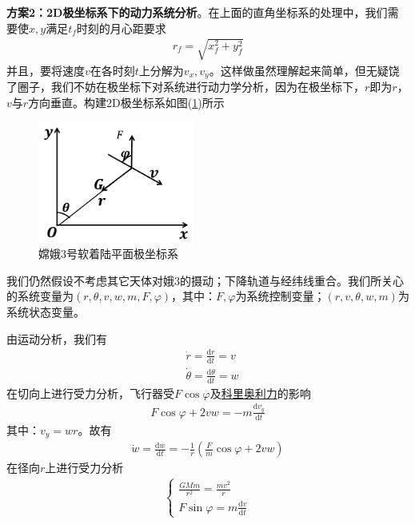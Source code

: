             \par
            \textbf{方案2：2D极坐标系下的动力系统分析}。在上面的直角坐标系的处理中，我们需要使$x,y$满足$t_f$时刻的月心距要求
            \begin{align*}
            r_f= \sqrt{x_f^2+y_f^2}
            \end{align*}
            并且，要将速度$v$在各时刻$t$上分解为$v_x,v_y$。这样做虽然理解起来简单，但无疑饶了圈子，我们不妨在极坐标下对系统进行动力学分析，因为在极坐标下，$r$即为$r$，$v$与$r$方向垂直。构建2D极坐标系如图(\ref{fig:嫦娥3号软着陆平面极坐标系})所示
            \begin{figure}[H]
            \centering
            \includegraphics[height=4cm]{images/Soft_landing2.jpg}
            \caption{嫦娥3号软着陆平面极坐标系}
            \label{fig:嫦娥3号软着陆平面极坐标系}
            \end{figure}
            \par
            我们仍然假设不考虑其它天体对娥3的摄动；下降轨道与经纬线重合。我们所关心的系统变量为$(r,\theta,v,w,m,F,\varphi)$，其中：$F,\varphi$为系统控制变量；$(r,v,\theta,w,m)$为系统状态变量。
            \par
            由运动分析，我们有
            \begin{align*}
            & \dot{r} = \frac{\mathrm{d}r}{\mathrm{d}t} = v\\
            & \dot{\theta} = \frac{\mathrm{d}\theta}{\mathrm{d}t} = w
            \end{align*}
            在切向上进行受力分析，飞行器受$F\cos\varphi$及\underline{科里奥利力}的影响
            \begin{align*}
            F\cos\varphi + 2vw = -m\frac{\mathrm{d}v_y}{\mathrm{d}t}
            \end{align*}
            其中：$v_y = wr$。故有
            \begin{align*}
            \dot{w} = \frac{\mathrm{d}w}{\mathrm{d}t} = -\frac{1}{r} (\frac{F}{m} \cos\varphi+2vw)
            \end{align*}
            在径向$r$上进行受力分析
            \begin{align*}
            \left\{
            \begin{aligned}
            \frac{GMm}{r^2} = \frac{mv^2}{r}\\
            F\sin \varphi = m\frac{\mathrm{d}v}{\mathrm{d}t}
            \end{aligned}
            \right.
            \end{align*}
